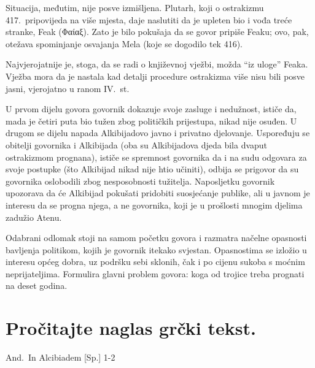 Situacija, međutim, nije posve izmišljena. Plutarh, koji o ostrakizmu 417.\ pripovijeda na više mjesta, daje naslutiti da je upleten bio i vođa treće stranke, Feak (Φαίαξ). Zato je bilo pokušaja da se govor pripiše Feaku; ovo, pak, otežava spominjanje osvajanja Mela (koje se dogodilo tek 416). 

Najvjerojatnije je, stoga, da se radi o književnoj vježbi, možda ``iz uloge'' Feaka. Vježba mora da je nastala kad detalji procedure ostrakizma više nisu bili posve jasni, vjerojatno u ranom IV.~st.

U prvom dijelu govora govornik dokazuje svoje zasluge i nedužnost, ističe da, mada je četiri puta bio tužen zbog političkih prijestupa, nikad nije osuđen. U drugom se dijelu napada Alkibijadovo javno i privatno djelovanje. Uspoređuju se obitelji govornika i Alkibijada (oba su Alkibijadova djeda bila dvaput ostrakizmom prognana), ističe se spremnost govornika da i na sudu odgovara za svoje postupke (što Alkibijad nikad nije htio učiniti), odbija se prigovor da su govornika oslobodili zbog nesposobnosti tužitelja. Naposljetku govornik upozorava da će Alkibijad pokušati pridobiti suosjećanje publike, ali u javnom je interesu da se progna njega, a ne govornika, koji je u prošlosti mnogim djelima zadužio Atenu.

Odabrani odlomak stoji na samom početku govora i razmatra načelne opasnosti bavljenja politikom, kojih je govornik itekako svjestan. Opasnostima se izložio u interesu općeg dobra, uz podršku sebi sklonih, čak i po cijenu sukoba s moćnim neprijateljima. Formulira glavni problem govora: koga od trojice treba prognati na deset godina.


\section*{Pročitajte naglas grčki tekst.}

And.\ In Alcibiadem [Sp.] 1-2


\medskip


